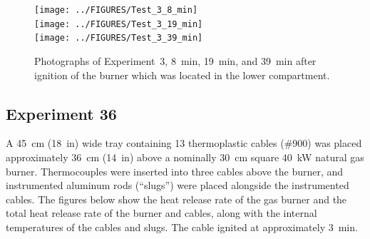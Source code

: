 \documentclass[12pt]{article}
\begin{document}
\begin{figure}[p]
\centering
\texttt{[image: ../FIGURES/Test\_3\_8\_min]} \\
\texttt{[image: ../FIGURES/Test\_3\_19\_min]} \\
\texttt{[image: ../FIGURES/Test\_3\_39\_min]}
\caption[Photographs of Experiment~3]{Photographs of Experiment~3, 8~min, 19~min, and 39~min after ignition of the burner which was located in the lower compartment.}
\label{fig:Test_3_photos}
\end{figure}


\clearpage

\subsection{Experiment 36}

A 45~cm (18~in) wide tray containing 13 thermoplastic cables (\#900) was placed approximately 36~cm (14~in) above a nominally 30~cm square 40~kW natural gas burner. Thermocouples were inserted into three cables above the burner, and instrumented aluminum rods (``slugs'') were placed alongside the instrumented cables. The figures below show the heat release rate of the gas burner and the total heat release rate of the burner and cables, along with the internal temperatures of the cables and slugs. The cable ignited at approximately 3~min.
\end{document}
